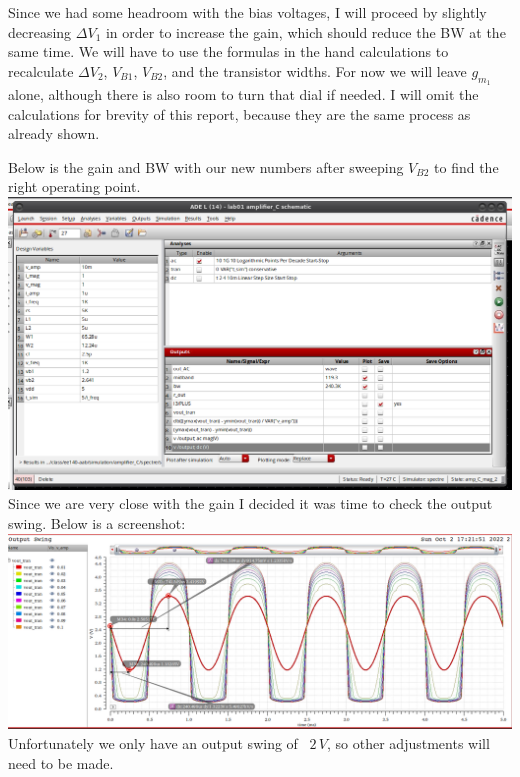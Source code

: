 \documentclass[12pt, fleqn]{article}
\begin{document}
Since we had some headroom with the bias voltages, I will proceed by slightly decreasing $\Delta V_1$ in order to increase the gain, which should reduce the BW at the same time. We will have to use the formulas in the hand calculations to recalculate $\Delta V_2$, $V_{B1}$, $V_{B2}$, and the transistor widths.  For now we will leave $g_{m_1}$ alone, although there is also room to turn that dial if needed.  I will omit the calculations for brevity of this report, because they are the same process as already shown.

Below is the gain and BW with our new numbers after sweeping $V_{B2}$ to find the right operating point.\\[0.1cm]
\includegraphics[scale=0.325, center]{c_gain_bw_new2.png}
\newpage\noindent
Since we are very close with the gain I decided it was time to check the output swing.  Below is a screenshot:\\[0.1cm]
\includegraphics[scale=0.325, center]{c_swing_init.png}\\
Unfortunately we only have an output swing of ~$2\,V$, so other adjustments will need to be made.
\end{document}
